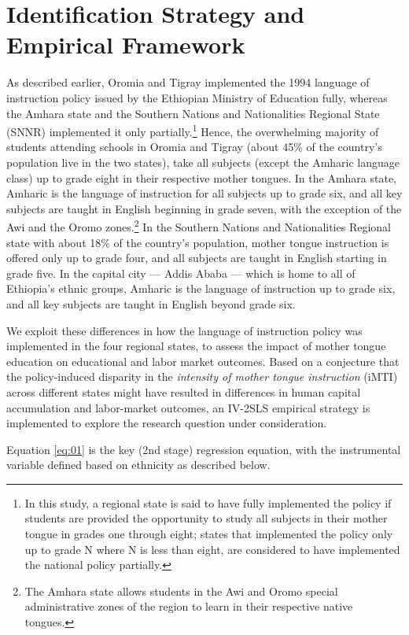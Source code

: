 
\section{Identification Strategy and Empirical Framework}

As described earlier, Oromia and Tigray implemented the 1994 language of instruction policy issued by the Ethiopian Ministry of Education fully, whereas the Amhara state and the Southern Nations and Nationalities Regional State (SNNR) implemented it only partially.\footnote{In this study, a regional state is said to have fully implemented the policy if students are provided the opportunity to study all subjects in their mother tongue in grades one through eight; states that implemented the policy only up to grade N where N is less than eight, are considered to have implemented the national policy partially.} Hence, the overwhelming majority of students attending schools in Oromia and Tigray (about 45\% of the country’s population live in the two states), take all subjects (except the Amharic language class) up to grade eight in their respective mother tongues. In the Amhara state, Amharic is the language of instruction for all subjects up to grade six, and all key subjects are taught in English beginning in grade seven, with the exception of the Awi and the Oromo zones.\footnote{The Amhara state allows students in the Awi and Oromo special administrative zones of the region to learn in their respective native tongues.} In the Southern Nations and Nationalities Regional state with about 18\% of the country’s population, mother tongue instruction is offered only up to grade four, and all subjects are taught in English starting in grade five. In the capital city --- Addis Ababa --- which is home to all of Ethiopia’s ethnic groups, Amharic is the language of instruction up to grade six, and all key subjects are taught in English beyond grade six.

We exploit these differences in how the language of instruction policy was implemented in the four regional states, to assess the impact of mother tongue education on educational and labor market outcomes. Based on a conjecture that the policy-induced disparity in the \emph{intensity of mother tongue instruction} (iMTI) across different states might have resulted in differences in human capital accumulation and labor-market outcomes, an IV-2SLS empirical strategy is implemented to explore the research question under consideration.   

Equation \eqref{eq:01} is the key (2nd stage) regression equation, with the instrumental variable defined based on ethnicity as described below.

